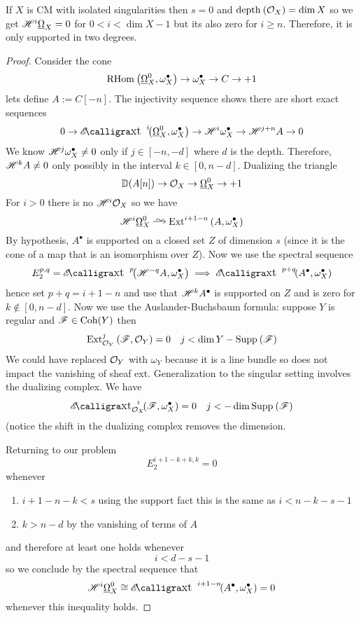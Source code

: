 \documentclass[12pt]{article}
\begin{document}
\begin{example}
If $X$ is CM with isolated singularities then $s = 0$ and $\mathrm{depth}_{} \left( \mathcal{O}_{X} \right) = \dim{X}$ so we get $\mathscr{H}^i \underline{\Omega}_X = 0$ for $0 < i < \dim{X} - 1$ but its also zero for $i \ge n$. Therefore, it is only supported in two degrees. 
\end{example}

\begin{proof}
Consider the cone
\[ \mathrm{RHom}_{} \left( \underline{\Omega}_X^0, \omega_X^\bullet \right) \to \omega_X^\bullet \to C \to + 1 \]
lets define $A := C[-n]$. The injectivity sequence shows there are short exact sequences
\[ 0 \to \shExt{i}{}{\ulO_X^0}{\omega_X^\bullet} \to \H^i \omega_X^\bullet \to \H^{j+n} A \to 0 \]
We know $\mathscr{H}^j \omega_X^\bullet \neq 0$ only if $j \in [-n,-d]$ where $d$ is the depth. Therefore, $\mathscr{H}^k A \neq 0$ only possibly in the interval $k \in [0, n-d]$. Dualizing the triangle
\[ \mathbb{D} (A[n]) \to \mathcal{O}_{X} \to \underline{\Omega}_X^0 \to + 1 \]
For $i > 0$ there is no $\mathscr{H}^i \mathcal{O}_{X}$ so we have 
\[ \H^i \ulO_X^0 \iso \Ext{i+1-n}{}{A}{\omega_X^\bullet} \]
By hypothesis, $A^\bullet$ is supported on a closed set $Z$ of dimension $s$ (since it is the cone of a map that is an isomorphism over $Z$). Now we use the spectral sequence
\[ E^{p,q}_2 = \shExt{p}{}{\H^{-q} A}{\omega_X^\bullet} \implies \shExt{p+q}{}{A^\bullet}{\omega_X^\bullet} \]
hence set $p + q = i + 1 - n$ and use that $\mathscr{H}^k A^\bullet$ is supported on $Z$ and is zero for $k \notin [0, n-d]$. Now we use the Auslander-Buchsbaum formula: suppose $Y$ is regular and $\mathscr{F} \in \mathrm{Coh}(Y)$ then
\[ \mathrm{Ext}^{j}_{\mathcal{O}_{Y}} \left( \mathscr{F}, \mathcal{O}_{Y} \right) = 0 \quad j < \dim{Y} - \mathrm{Supp}_{}\left(\mathscr{F} \right) \]  
We could have replaced $\mathcal{O}_{Y}$ with $\omega_Y$ because it is a line bundle so does not impact the vanishing of sheaf ext.
Generalization to the singular setting involves the dualizing complex. We have
\[ \shExt{i}{\struct{X}}{\F}{\omega_X^\bullet} = 0 \quad j < -  \dim \Supp{}{\F} \]
(notice the shift in the dualizing complex removes the dimension. 
\par 
Returning to our problem
\[ E^{i+1 - k + k, k}_2 = 0 \]
whenever
\begin{enumerate}
\item $i + 1 - n - k < s$ using the support fact this is the same as $i < n - k - s  - 1$
\item $k > n - d$ by the vanishing of terms of $A$
\end{enumerate}
and therefore at least one holds whenever 
\[ i < d - s - 1 \] 
so we conclude by the spectral sequence that 
\[ \H^i \ulO_X^0 \cong \shExt{i+1-n}{}{A^\bullet}{\omega_X^\bullet} = 0 \]
whenever this inequality holds.
\end{proof}
\end{document}
